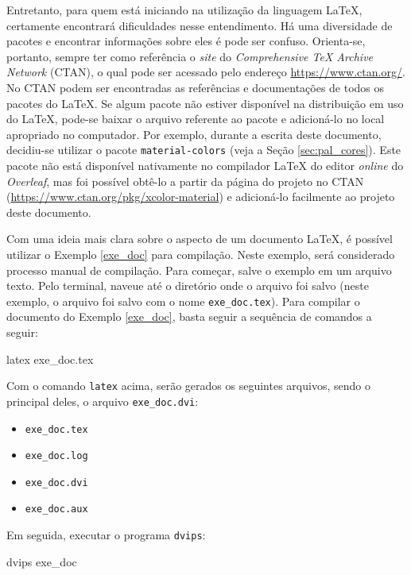 Entretanto, para quem está iniciando na utilização da linguagem \LaTeX{}, certamente encontrará dificuldades nesse entendimento. Há uma diversidade de pacotes e encontrar informações sobre eles é pode ser confuso. Orienta-se, portanto, sempre ter como referência o \textit{site} do \textit{Comprehensive TeX Archive Network} (CTAN), o qual pode ser acessado pelo endereço \url{https://www.ctan.org/}. No CTAN podem ser encontradas as referências e documentações de todos os pacotes do \LaTeX{}. Se algum pacote não estiver disponível na distribuição em uso do \LaTeX{}, pode-se baixar o arquivo referente ao pacote e adicioná-lo no local apropriado no computador. Por exemplo, durante a escrita deste documento, decidiu-se utilizar o pacote {\tt material-colors} (veja a Seção \ref{sec:pal_cores}). Este pacote não está disponível nativamente no compilador \LaTeX{} do editor \textit{online} do \textit{Overleaf}, mas foi possível obtê-lo a partir da página do projeto no CTAN (\url{https://www.ctan.org/pkg/xcolor-material}) e adicioná-lo facilmente ao projeto deste documento.

Com uma ideia mais clara sobre o aspecto de um documento \LaTeX{}, é possível utilizar o Exemplo \ref{exe_doc} para compilação. Neste exemplo, será considerado processo manual de compilação. Para começar, salve o exemplo em um arquivo texto. Pelo terminal, naveue até o diretório onde o arquivo foi salvo (neste exemplo, o arquivo foi salvo com o nome {\tt exe\_doc.tex}). Para compilar o documento do Exemplo \ref{exe_doc}, basta seguir a sequência de comandos a seguir:

\begin{meucomando}
latex exe_doc.tex 
\end{meucomando}

Com o comando {\tt latex} acima, serão gerados os seguintes arquivos, sendo o principal deles, o arquivo {\tt exe\_doc.dvi}:

\begin{itemize}
  \item {\tt exe\_doc.tex}  
  \item {\tt exe\_doc.log}
  \item {\tt exe\_doc.dvi}
  \item {\tt exe\_doc.aux}
\end{itemize}

Em seguida, executar o programa {\tt dvips}:

\begin{meucomando}
dvips exe_doc
\end{meucomando}


